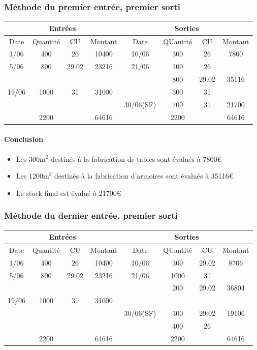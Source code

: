 \documentclass[12pt,a4paper,openany]{report}
\begin{document}
	 \subsubsection{Méthode du premier entrée, premier sorti}
	 \begin{tabular}{|c|c|c|c| |c|c|c|c|}
		 \hline
		 \multicolumn{4}{|c||}{Entrées} & \multicolumn{4}{c|}{Sorties}\\
		 \hline
		 Date & Quantité & CU & Montant & Date & QUantité & CU & Montant\\
		 \hline
		 1/06 & 400 & 26 & 10400 & 10/06&300&26&7800\\
		 5/06&800&29.02&23216&21/06&100&26&\\
		 &&&&&800&29.02&35116\\
		 19/06&1000&31&31000&&300&31&\\
		 &&&&30/06(SF)&700&31&21700\\
		 \hline
		 &2200&&64616&&2200&&64616 \\
		 \hline
	 \end{tabular}
	 \paragraph{Conclusion} 
	 \begin{itemize}
		 \item Les 300m$^2$ destinés à la fabrication de tables sont évalués à 7800\euro
		 \item Les 1200m$^2$ destinés à la fabrication d'armoires sont évalués à 35116\euro
		 \item Le stock final est évalué à 21700\euro 
	 \end{itemize}
	 \subsubsection{Méthode du dernier entrée, premier sorti}
	 \begin{tabular}{|c|c|c|c| |c|c|c|c|}
		 \hline
		 \multicolumn{4}{|c||}{Entrées} & \multicolumn{4}{c|}{Sorties}\\
		 \hline
		 Date & Quantité & CU & Montant & Date & QUantité & CU & Montant\\
		 \hline
		 1/06 & 400 & 26 & 10400 & 10/06&300&29.02&8706\\
		 5/06&800&29.02&23216&21/06&1000&31&\\
		 &&&&&200&29.02&36804\\
		 19/06&1000&31&31000&&&&\\
		 &&&&30/06(SF)&300&29.02&19106\\
		 &&&&&400&26&\\
		 \hline
		 &2200&&64616&&2200&&64616 \\
		 \hline
	 \end{tabular}
\end{document}
